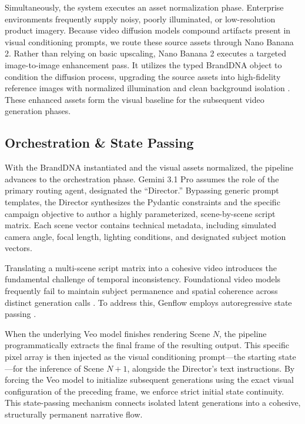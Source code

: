 \documentclass[sigconf,authordraft]{acmart}
\begin{document}
Simultaneously, the system executes an asset normalization phase. Enterprise environments frequently supply noisy, poorly illuminated, or low-resolution product imagery. Because video diffusion models compound artifacts present in visual conditioning prompts, we route these source assets through Nano Banana 2. Rather than relying on basic upscaling, Nano Banana 2 executes a targeted image-to-image enhancement pass. It utilizes the typed BrandDNA object to condition the diffusion process, upgrading the source assets into high-fidelity reference images with normalized illumination and clean background isolation \cite{ramesh2022high}. These enhanced assets form the visual baseline for the subsequent video generation phases.

\subsection{Orchestration \& State Passing}

With the BrandDNA instantiated and the visual assets normalized, the pipeline advances to the orchestration phase. Gemini 3.1 Pro assumes the role of the primary routing agent, designated the ``Director.'' Bypassing generic prompt templates, the Director synthesizes the Pydantic constraints and the specific campaign objective to author a highly parameterized, scene-by-scene script matrix. Each scene vector contains technical metadata, including simulated camera angle, focal length, lighting conditions, and designated subject motion vectors.

Translating a multi-scene script matrix into a cohesive video introduces the fundamental challenge of temporal inconsistency. Foundational video models frequently fail to maintain subject permanence and spatial coherence across distinct generation calls \cite{blattmann2024temporal}. To address this, Genflow employs autoregressive state passing \cite{blattmann2024align}.

When the underlying Veo model finishes rendering Scene $N$, the pipeline programmatically extracts the final frame of the resulting output. This specific pixel array is then injected as the visual conditioning prompt---the starting state---for the inference of Scene $N+1$, alongside the Director's text instructions. By forcing the Veo model to initialize subsequent generations using the exact visual configuration of the preceding frame, we enforce strict initial state continuity. This state-passing mechanism connects isolated latent generations into a cohesive, structurally permanent narrative flow.
\end{document}
